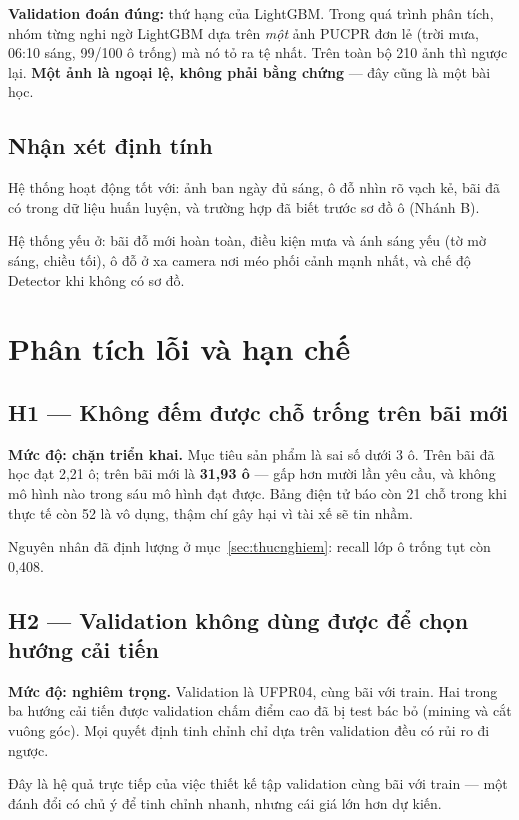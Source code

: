 \documentclass[12pt]{ai_conquer2026}
\begin{document}
\textbf{Validation đoán đúng:} thứ hạng của LightGBM. Trong quá trình phân tích, nhóm từng nghi ngờ LightGBM dựa trên \textit{một} ảnh PUCPR đơn lẻ (trời mưa, 06:10 sáng, 99/100 ô trống) mà nó tỏ ra tệ nhất. Trên toàn bộ 210 ảnh thì ngược lại. \textbf{Một ảnh là ngoại lệ, không phải bằng chứng} --- đây cũng là một bài học.

\subsection{Nhận xét định tính}

Hệ thống hoạt động tốt với: ảnh ban ngày đủ sáng, ô đỗ nhìn rõ vạch kẻ, bãi đã có trong dữ liệu huấn luyện, và trường hợp đã biết trước sơ đồ ô (Nhánh B).

Hệ thống yếu ở: bãi đỗ mới hoàn toàn, điều kiện mưa và ánh sáng yếu (tờ mờ sáng, chiều tối), ô đỗ ở xa camera nơi méo phối cảnh mạnh nhất, và chế độ Detector khi không có sơ đồ.

\newpage
\section{Phân tích lỗi và hạn chế}
\label{sec:hanche}

\subsection{H1 --- Không đếm được chỗ trống trên bãi mới}

\textbf{Mức độ: chặn triển khai.} Mục tiêu sản phẩm là sai số dưới 3 ô. Trên bãi đã học đạt 2,21 ô; trên bãi mới là \textbf{31,93 ô} --- gấp hơn mười lần yêu cầu, và không mô hình nào trong sáu mô hình đạt được. Bảng điện tử báo còn 21 chỗ trong khi thực tế còn 52 là vô dụng, thậm chí gây hại vì tài xế sẽ tin nhầm.

Nguyên nhân đã định lượng ở mục~\ref{sec:thucnghiem}: recall lớp ô trống tụt còn 0,408.

\subsection{H2 --- Validation không dùng được để chọn hướng cải tiến}

\textbf{Mức độ: nghiêm trọng.} Validation là UFPR04, cùng bãi với train. Hai trong ba hướng cải tiến được validation chấm điểm cao đã bị test bác bỏ (mining và cắt vuông góc). Mọi quyết định tinh chỉnh chỉ dựa trên validation đều có rủi ro đi ngược.

Đây là hệ quả trực tiếp của việc thiết kế tập validation cùng bãi với train --- một đánh đổi có chủ ý để tinh chỉnh nhanh, nhưng cái giá lớn hơn dự kiến.
\end{document}
